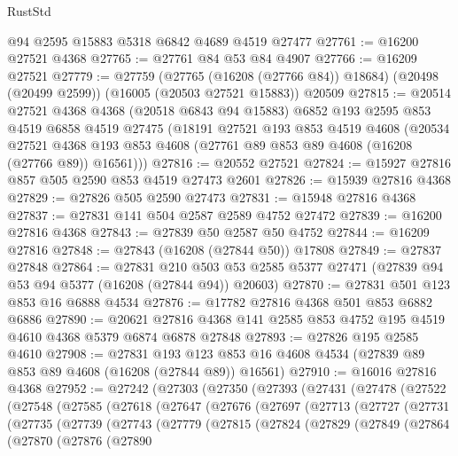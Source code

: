 \begin{lexlean}{RustStd}
\begin{coremodule}
    @94
    @2595
    @15883
    @5318
    @6842
    @4689
    @4519
    @27477
@27761 := @16200 @27521 @4368
@27765 := @27761 @84 @53 @84 @4907
@27766 := @16209 @27521
@27779 := @27759
    (@27765 (@16208 (@27766 @84)) @18684)
    (@20498 (@20499 @2599))
    (@16005 (@20503 @27521 @15883))
    @20509
@27815 := @20514
    @27521
    @4368
    @4368
    (@20518 @6843 @94 @15883)
    @6852
    @193
    @2595
    @853
    @4519
    @6858
    @4519
    @27475
    (@18191
      @27521
      @193
      @853
      @4519
      @4608
      (@20534
        @27521
        @4368
        @193
        @853
        @4608
        (@27761 @89 @853 @89 @4608 (@16208 (@27766 @89)) @16561)))
@27816 := @20552 @27521
@27824 := @15927 @27816 @857 @505 @2590 @853 @4519 @27473 @2601
@27826 := @15939 @27816 @4368
@27829 := @27826 @505 @2590 @27473
@27831 := @15948 @27816 @4368
@27837 := @27831 @141 @504 @2587 @2589 @4752 @27472
@27839 := @16200 @27816 @4368
@27843 := @27839 @50 @2587 @50 @4752
@27844 := @16209 @27816
@27848 := @27843 (@16208 (@27844 @50)) @17808
@27849 := @27837 @27848
@27864 := @27831
    @210
    @503
    @53
    @2585
    @5377
    @27471
    (@27839 @94 @53 @94 @5377 (@16208 (@27844 @94)) @20603)
@27870 := @27831 @501 @123 @853 @16 @6888 @4534
@27876 := @17782 @27816 @4368 @501 @853 @6882 @6886
@27890 := @20621 @27816 @4368 @141 @2585 @853 @4752 @195 @4519 @4610 @4368 @5379 @6874 @6878 @27848
@27893 := @27826 @195 @2585 @4610
@27908 := @27831
    @193
    @123
    @853
    @16
    @4608
    @4534
    (@27839 @89 @853 @89 @4608 (@16208 (@27844 @89)) @16561)
@27910 := @16016 @27816 @4368
@27952 := @27242
    (@27303
      (@27350
        (@27393
          (@27431
            (@27478
              (@27522
                (@27548
                  (@27585
                    (@27618
                      (@27647
                        (@27676
                          (@27697
                            (@27713
                              (@27727
                                (@27731
                                  (@27735
                                    (@27739
                                      (@27743
                                        (@27779
                                          (@27815
                                            (@27824
                                              (@27829
                                                (@27849
                                                  (@27864
                                                    (@27870
                                                      (@27876
                                                        (@27890

\end{coremodule}
\end{lexlean}
